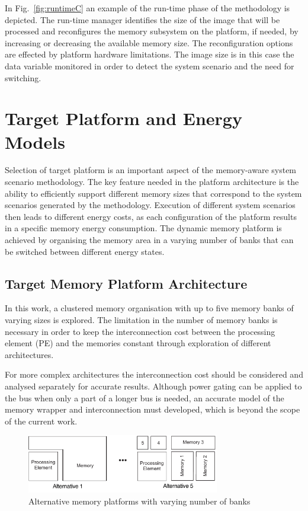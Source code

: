 In Fig.~\ref{fig:runtimeC} an example of the run-time phase of the methodology is depicted. 
The run-time manager identifies the size of the image that will be processed and reconfigures the memory subsystem on the platform, if needed, by increasing or decreasing the available memory size. 
The reconfiguration options are effected by platform hardware limitations. 
The image size is in this case the data variable monitored in order to detect the system scenario and the need for switching.

\section{Target Platform and Energy Models}
\label{sec:platformC}

Selection of target platform is an important aspect of the memory-aware system scenario methodology. 
The key feature needed in the platform architecture is the ability to efficiently support different memory sizes that correspond to the system scenarios generated by the methodology. 
Execution of different system scenarios then leads to different energy costs, as each configuration of the platform results in a specific memory energy consumption. 
The dynamic memory platform is achieved by organising the memory area in a varying number of banks that can be switched between different energy states. 

\subsection{Target Memory Platform Architecture}

In this work, a clustered memory organisation with up to five memory banks of varying sizes is explored. 
The limitation in the number of memory banks is necessary in order to keep the interconnection cost between the processing element (PE) and the memories constant through exploration of different architectures. 

For more complex architectures the interconnection cost should be considered and analysed separately for accurate results. 
Although power gating can be applied to the bus when only a part of a longer bus is needed, an accurate model of the memory wrapper and interconnection must developed, which is beyond the scope of the current work. 

\begin{figure}
\centering
\includegraphics[width=0.75\textwidth]{C/platform.pdf}
\caption{Alternative memory platforms with varying number of banks}
\label{fig:platformC}
\end{figure}

